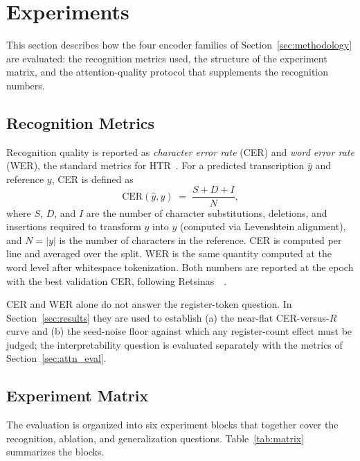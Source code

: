 \section{Experiments}
\label{sec:experiments}

This section describes how the four encoder families of Section~\ref{sec:methodology} are evaluated: the recognition metrics used, the structure of the experiment matrix, and the attention-quality protocol that supplements the recognition numbers.

\subsection{Recognition Metrics}
\label{sec:metrics_reco}

Recognition quality is reported as \emph{character error rate} (CER) and \emph{word error rate} (WER), the standard metrics for HTR~\cite{marti2002iam, retsinas2022htrbestpractices}. For a predicted transcription $\hat{y}$ and reference $y$, CER is defined as
\begin{equation}
\label{eq:cer}
\mathrm{CER}(\hat{y}, y) \;=\; \frac{S + D + I}{N},
\end{equation}
where $S$, $D$, and $I$ are the number of character substitutions, deletions, and insertions required to transform $\hat{y}$ into $y$ (computed via Levenshtein alignment), and $N = |y|$ is the number of characters in the reference. CER is computed per line and averaged over the split. WER is the same quantity computed at the word level after whitespace tokenization. Both numbers are reported at the epoch with the best validation CER, following Retsinas~\etal~\cite{retsinas2022htrbestpractices}.

CER and WER alone do not answer the register-token question. In Section~\ref{sec:results} they are used to establish (a) the near-flat CER-versus-$R$ curve and (b) the seed-noise floor against which any register-count effect must be judged; the interpretability question is evaluated separately with the metrics of Section~\ref{sec:attn_eval}.

\subsection{Experiment Matrix}
\label{sec:matrix}

The evaluation is organized into six experiment blocks that together cover the recognition, ablation, and generalization questions. Table~\ref{tab:matrix} summarizes the blocks.

